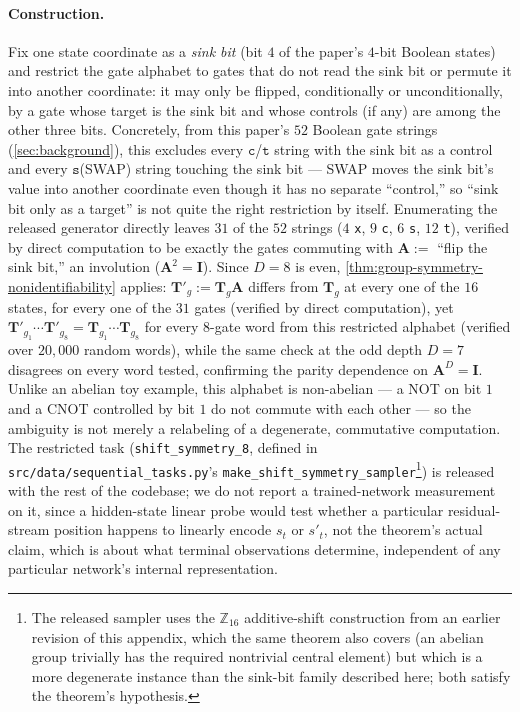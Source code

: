 \paragraph{Construction.} Fix one state coordinate as a \emph{sink bit}
(bit $4$ of the paper's $4$-bit Boolean states) and restrict the gate
alphabet to gates that do not read the sink bit or permute it into another
coordinate: it may only be flipped, conditionally or unconditionally, by a
gate whose target is the sink bit and whose controls (if any) are among
the other three bits. Concretely, from this paper's $52$ Boolean gate
strings (\cref{sec:background}), this excludes every $\texttt{c}$/$\texttt{t}$
string with the sink bit as a control and every $\texttt{s}$(SWAP) string
touching the sink bit --- SWAP moves the sink bit's value into another
coordinate even though it has no separate ``control,'' so ``sink bit only
as a target'' is not quite the right restriction by itself. Enumerating
the released generator directly leaves $31$ of the $52$ strings ($4$
\texttt{x}, $9$ \texttt{c}, $6$ \texttt{s}, $12$ \texttt{t}), verified by
direct computation to be exactly the gates commuting with
$\bm A:=$ ``flip the sink bit,'' an involution ($\bm A^2=\bm I$). Since
$D=8$ is even, \cref{thm:group-symmetry-nonidentifiability} applies:
$\bm T'_g:=\bm T_g\bm A$ differs from $\bm T_g$ at every one of the $16$
states, for every one of the $31$ gates (verified by direct computation),
yet $\bm T'_{g_1}\cdots\bm T'_{g_8}=\bm T_{g_1}\cdots\bm T_{g_8}$ for every
8-gate word from this restricted alphabet (verified over $20{,}000$ random
words), while the same check at the odd depth $D=7$ disagrees on every
word tested, confirming the parity dependence on $\bm A^D=\bm I$. Unlike
an abelian toy example, this alphabet is non-abelian --- a NOT on bit $1$
and a CNOT controlled by bit $1$ do not commute with each other --- so the
ambiguity is not merely a relabeling of a degenerate, commutative
computation. The restricted task (\texttt{shift\_symmetry\_8}, defined in
\texttt{src/data/sequential\_tasks.py}'s
\texttt{make\_shift\_symmetry\_sampler}\footnote{The released sampler uses
the $\mathbb Z_{16}$ additive-shift construction from an earlier revision
of this appendix, which the same theorem also covers (an abelian group
trivially has the required nontrivial central element) but which is a more
degenerate instance than the sink-bit family described here; both satisfy
the theorem's hypothesis.}) is released with the rest of the codebase; we
do not report a trained-network measurement on it, since a hidden-state
linear probe would test whether a particular residual-stream position
happens to linearly encode $s_t$ or $s'_t$, not the theorem's actual claim,
which is about what terminal observations determine, independent of any
particular network's internal representation.

